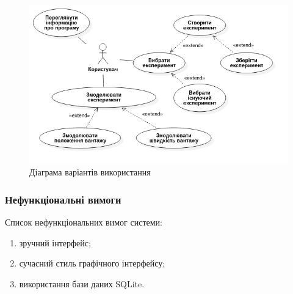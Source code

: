 \begin{figure}[H]
  \centering
    \includegraphics[width=1\textwidth]{uml_usecase}
  \caption{Діаграма варіантів використання}
  \label{fig:usecase}
\end{figure}

\subsubsection{Нефункціональні вимоги}
Список нефункціональних вимог системи:
\begin{enumerate}[label={\arabic*)}]
	\item зручний інтерфейс;
	\item сучасний стиль графічного інтерфейсу;
	\item використання бази даних SQLite.
\end{enumerate}


